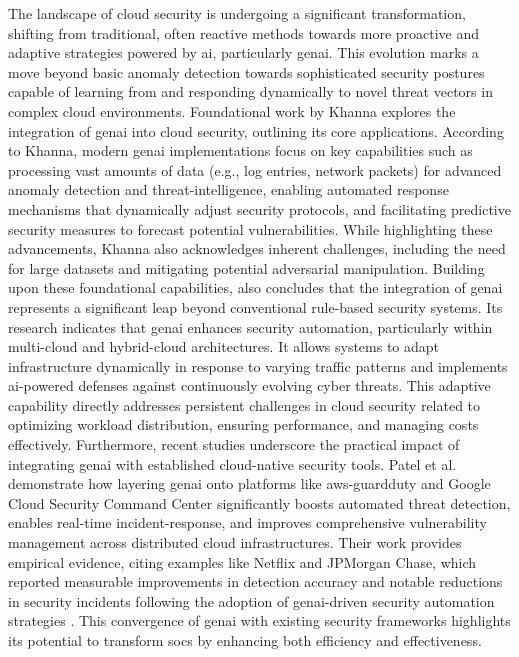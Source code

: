 The landscape of cloud security is undergoing a significant transformation, shifting from traditional, often reactive methods towards more proactive and adaptive strategies powered by \gls{ai}, particularly \gls{genai}. This evolution marks a move beyond basic anomaly detection towards sophisticated security postures capable of learning from and responding dynamically to novel threat vectors in complex cloud environments.
Foundational work by Khanna \cite{khanna_enhancing_2024} explores the integration of \gls{genai} into cloud security, outlining its core applications. According to Khanna, modern \gls{genai} implementations focus on key capabilities such as processing vast amounts of data (e.g., log entries, network packets) for advanced anomaly detection and \gls{threat-intelligence}, enabling automated response mechanisms that dynamically adjust security protocols, and facilitating predictive security measures to forecast potential vulnerabilities. While highlighting these advancements, Khanna also acknowledges inherent challenges, including the need for large datasets and mitigating potential adversarial manipulation.
Building upon these foundational capabilities, \cite{seth_ai_2025} also concludes that the integration of \gls{genai} represents a significant leap beyond conventional rule-based security systems. Its research indicates that \gls{genai} enhances security automation, particularly within \gls{multi-cloud} and \gls{hybrid-cloud} architectures. It allows systems to adapt infrastructure dynamically in response to varying traffic patterns and implements \gls{ai}-powered defenses against continuously evolving cyber threats. This adaptive capability directly addresses persistent challenges in cloud security related to optimizing workload distribution, ensuring performance, and managing costs effectively.
Furthermore, recent studies underscore the practical impact of integrating \gls{genai} with established \gls{cloud-native} security tools. Patel et al. \cite{patel_generative_2025} demonstrate how layering \gls{genai} onto platforms like \gls{aws-guardduty} and Google Cloud Security Command Center significantly boosts automated threat detection, enables real-time \gls{incident-response}, and improves comprehensive vulnerability management across distributed cloud infrastructures. Their work provides empirical evidence, citing examples like Netflix and JPMorgan Chase, which reported measurable improvements in detection accuracy and notable reductions in security incidents following the adoption of \gls{genai}-driven security automation strategies \cite{patel_generative_2025}. This convergence of \gls{genai} with existing security frameworks highlights its potential to transform \glspl{soc} by enhancing both efficiency and effectiveness.

